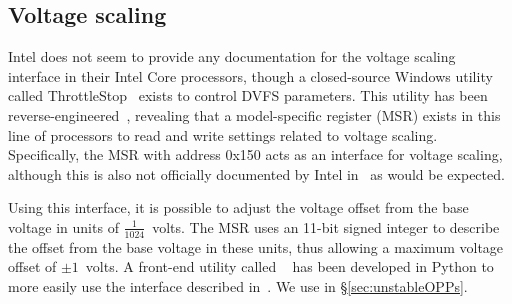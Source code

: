 \subsection{Voltage scaling}
\label{sec:undervolt}

Intel does not seem to provide any documentation for the voltage
scaling interface in their Intel Core processors, though a closed-source
Windows utility called ThrottleStop~\cite{throttlestop} exists to control DVFS
parameters. This utility has been reverse-engineered~\cite{elersicDoc},
revealing that a model-specific register (MSR) exists in this line of processors
to read and write settings related to voltage scaling. Specifically, the MSR
with address 0x150 acts as an interface for voltage scaling, although this is
also not officially documented by Intel in~\cite[Vol. 4, §2.13]{intelDevManual}
as would be expected.

Using this interface, it is possible to adjust the voltage offset from the base
voltage in units of $\frac{1}{1024}$~volts. The MSR uses an 11-bit signed 
integer to describe the offset from the base voltage in these units, thus
allowing a maximum voltage offset of $\pm{1}$~volts. A front-end utility called
~\cite{whewellUndervolt} has been developed in Python to more
easily use the interface described in~\cite{elersicDoc}. We use 
in §\ref{sec:unstableOPPs}.

